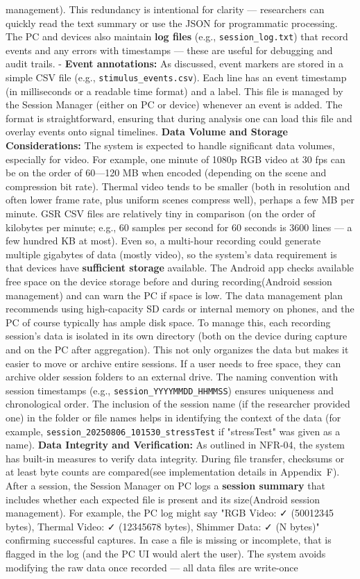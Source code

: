 management). This redundancy is intentional for clarity --- researchers can quickly read the text summary or use the JSON for programmatic processing. The PC and devices also maintain \textbf{log files} (e.g., \texttt{session\_log.txt}) that record events and any errors with timestamps --- these are useful for debugging and audit trails. - \textbf{Event annotations:} As discussed, event markers are stored in a simple CSV file (e.g., \texttt{stimulus\_events.csv}). Each line has an event timestamp (in milliseconds or a readable time format) and a label. This file is managed by the Session Manager (either on PC or device) whenever an event is added. The format is straightforward, ensuring that during analysis one can load this file and overlay events onto signal timelines. \textbf{Data Volume and Storage Considerations:} The system is expected to handle significant data volumes, especially for video. For example, one minute of 1080p RGB video at 30 fps can be on the order of 60---120 MB when encoded (depending on the scene and compression bit rate). Thermal video tends to be smaller (both in resolution and often lower frame rate, plus uniform scenes compress well), perhaps a few MB per minute. GSR CSV files are relatively tiny in comparison (on the order of kilobytes per minute; e.g., 60 samples per second for 60 seconds is 3600 lines --- a few hundred KB at most). Even so, a multi-hour recording could generate multiple gigabytes of data (mostly video), so the system's data requirement is that devices have \textbf{sufficient storage} available. The Android app checks available free space on the device storage before and during recording(Android session management) and can warn the PC if space is low. The data management plan recommends using high-capacity SD cards or internal memory on phones, and the PC of course typically has ample disk space. To manage this, each recording session's data is isolated in its own directory (both on the device during capture and on the PC after aggregation). This not only organizes the data but makes it easier to move or archive entire sessions. If a user needs to free space, they can archive older session folders to an external drive. The naming convention with session timestamps (e.g., \texttt{session_YYYYMMDD_HHMMSS}) ensures uniqueness and chronological order. The inclusion of the session name (if the researcher provided one) in the folder or file names helps in identifying the context of the data (for example, \texttt{session_20250806_101530_stressTest} if "stressTest" was given as a name). \textbf{Data Integrity and Verification:} As outlined in NFR-04, the system has built-in measures to verify data integrity. During file transfer, checksums or at least byte counts are compared(see implementation details in Appendix~F). After a session, the Session Manager on PC logs a \textbf{session summary} that includes whether each expected file is present and its size(Android session management). For example, the PC log might say "RGB Video: ✓ (50012345 bytes), Thermal Video: ✓ (12345678 bytes), Shimmer Data: ✓ (N bytes)" confirming successful captures. In case a file is missing or incomplete, that is flagged in the log (and the PC UI would alert the user). The system avoids modifying the raw data once recorded --- all data files are write-once 